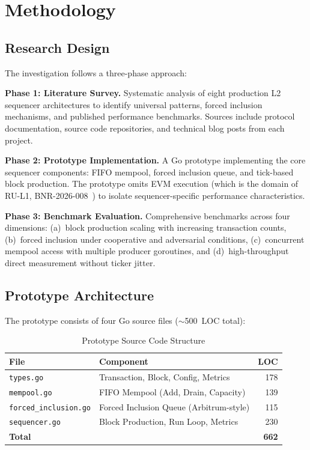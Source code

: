 
\section{Methodology}

\subsection{Research Design}

The investigation follows a three-phase approach:

\textbf{Phase 1: Literature Survey.} Systematic analysis of eight production L2 sequencer
architectures to identify universal patterns, forced inclusion mechanisms, and published
performance benchmarks. Sources include protocol documentation, source code repositories,
and technical blog posts from each project.

\textbf{Phase 2: Prototype Implementation.} A Go prototype implementing the core
sequencer components: FIFO mempool, forced inclusion queue, and tick-based block
production. The prototype omits EVM execution (which is the domain of RU-L1,
BNR-2026-008~\cite{bnr2026008evm}) to isolate sequencer-specific performance
characteristics.

\textbf{Phase 3: Benchmark Evaluation.} Comprehensive benchmarks across four dimensions:
(a)~block production scaling with increasing transaction counts, (b)~forced inclusion
under cooperative and adversarial conditions, (c)~concurrent mempool access with multiple
producer goroutines, and (d)~high-throughput direct measurement without ticker jitter.

\subsection{Prototype Architecture}

The prototype consists of four Go source files (${\sim}$500~LOC total):

\begin{table}[htbp]
\caption{Prototype Source Code Structure}
\label{tab:prototype-structure}
\centering
\begin{tabular}{llr}
\toprule
\textbf{File} & \textbf{Component} & \textbf{LOC} \\
\midrule
\texttt{types.go} & Transaction, Block, Config, Metrics & 178 \\
\texttt{mempool.go} & FIFO Mempool (Add, Drain, Capacity) & 139 \\
\texttt{forced\_inclusion.go} & Forced Inclusion Queue (Arbitrum-style) & 115 \\
\texttt{sequencer.go} & Block Production, Run Loop, Metrics & 230 \\
\midrule
\textbf{Total} & & \textbf{662} \\
\bottomrule
\end{tabular}
\end{table}

